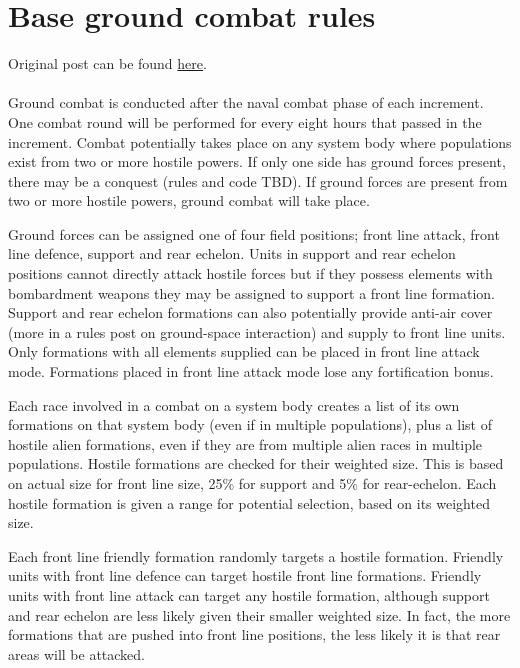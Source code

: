\documentclass[../../Aurora C# unofficial manual.tex]{subfiles}
\begin{document}
	\section{Base ground combat rules}
	Original post can be found
	\href{http://aurora2.pentarch.org/index.php?topic=8495.msg109786#msg109786}{here}.
	\\\\
	
	Ground combat is conducted after the naval combat phase of each increment. One combat round will be performed for every eight hours that passed in the increment. Combat potentially takes place on any system body where populations exist from two or more hostile powers. If only one side has ground forces present, there may be a conquest (rules and code TBD). If ground forces are present from two or more hostile powers, ground combat will take place.
	
	Ground forces can be assigned one of four field positions; front line attack, front line defence, support and rear echelon. Units in support and rear echelon positions cannot directly attack hostile forces but if they possess elements with bombardment weapons they may be assigned to support a front line formation. Support and rear echelon formations can also potentially provide anti-air cover (more in a rules post on ground-space interaction) and supply to front line units. Only formations with all elements supplied can be placed in front line attack mode. Formations placed in front line attack mode lose any fortification bonus.
	
	Each race involved in a combat on a system body creates a list of its own formations on that system body (even if in multiple populations), plus a list of hostile alien formations, even if they are from multiple alien races in multiple populations. Hostile formations are checked for their weighted size.  This is based on actual size for front line size, 25\% for support and 5\% for rear-echelon. Each hostile formation is given a range for potential selection, based on its weighted size.
	
	Each front line friendly formation randomly targets a hostile formation. Friendly units with front line defence can target hostile front line formations. Friendly units with front line attack can target any hostile formation, although support and rear echelon are less likely given their smaller weighted size. In fact, the more formations that are pushed into front line positions, the less likely it is that rear areas will be attacked.
	
\end{document}
